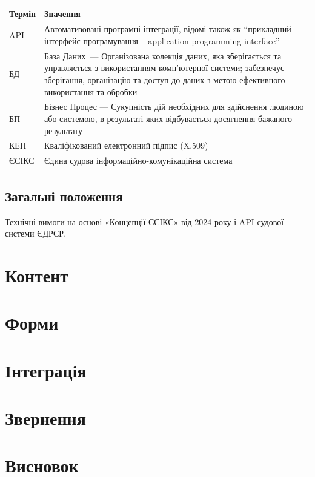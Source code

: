 \documentclass{article}
\begin{document}
\begin{longtable}{p{4cm}p{10cm}}
\toprule
\textbf{Термін} & \textbf{Значення} \\
\midrule
API & Автоматизовані програмні інтеграції, відомі також як “прикладний інтерфейс програмування – application programming interface” \\
БД & База Даних — Організована колекція даних, яка зберігається та управляється з використанням комп'ютерної системи; забезпечує зберігання, організацію та доступ до даних з метою ефективного використання та обробки \\
БП & Бізнес Процес — Сукупність дій необхідних для здійснення людиною або системою, в результаті яких відбувається досягнення бажаного результату \\
КЕП & Кваліфікований електронний підпис (X.509) \\
ЄСІКС & Єдина судова інформаційно-комунікаційна система \\
\bottomrule
\end{longtable}

\subsection*{Загальні положення}

Технічні вимоги на основі «Концепції ЄСІКС» від 2024 року \cite{esiks} і API судової системи ЄДРСР\cite{eCourt}.

\newpage
\section{Контент}

\section{Форми}

\section{Інтеграція}

\section{Звернення}

\newpage
\section*{Висновок}
\end{document}
